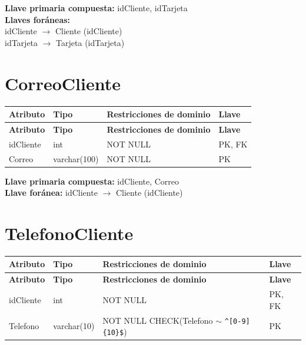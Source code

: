 \documentclass[12pt]{article}
\begin{document}
\vspace{2pt}
\textbf{Llave primaria compuesta:} idCliente, idTarjeta\\
\textbf{Llaves foráneas:}\\
idCliente $\rightarrow$ Cliente (idCliente)\\
idTarjeta $\rightarrow$ Tarjeta (idTarjeta)\\


\section*{CorreoCliente}

\begin{longtable}{p{3.5cm} p{2.5cm} p{7.5cm} p{1.5cm}}
\label{tab:correocliente}\\
\toprule
\textbf{Atributo} & \textbf{Tipo} & \textbf{Restricciones de dominio} & \textbf{Llave} \\
\midrule
\endfirsthead

\toprule
\textbf{Atributo} & \textbf{Tipo} & \textbf{Restricciones de dominio} & \textbf{Llave} \\
\midrule
\endhead
\bottomrule
\endfoot

idCliente 
& int 
& NOT NULL
& PK, FK \\

Correo 
& varchar(100) 
& NOT NULL
& PK \\

\end{longtable}

\vspace{2pt}
\textbf{Llave primaria compuesta:} idCliente, Correo\\
\textbf{Llave foránea:} idCliente $\rightarrow$ Cliente (idCliente)\\


\section*{TelefonoCliente}

\begin{longtable}{p{3.5cm} p{2.5cm} p{7.5cm} p{1.5cm}}
\label{tab:telefonocliente}\\
\toprule
\textbf{Atributo} & \textbf{Tipo} & \textbf{Restricciones de dominio} & \textbf{Llave} \\
\midrule
\endfirsthead

\toprule
\textbf{Atributo} & \textbf{Tipo} & \textbf{Restricciones de dominio} & \textbf{Llave} \\
\midrule
\endhead
\bottomrule
\endfoot

idCliente 
& int 
& NOT NULL
& PK, FK \\

Telefono 
& varchar(10) 
& NOT NULL \newline CHECK(Telefono $\sim$ \texttt{\^{}[0-9]\{10\}\$})
& PK \\

\end{longtable}
\end{document}
